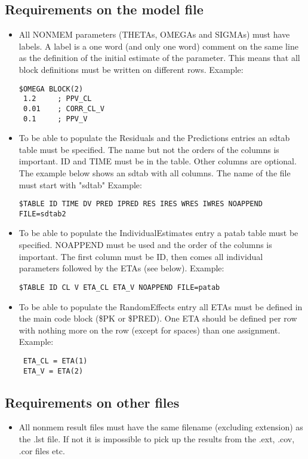 \subsection{Requirements on the model file}
\begin{itemize}
    \item All NONMEM parameters (THETAs, OMEGAs and SIGMAs) must have labels. A label is a one word (and only one word) comment on the same line as the definition of the initial estimate of the parameter. This means that all block definitions must be written on different rows. Example:
        \begin{verbatim}
$OMEGA BLOCK(2)
 1.2     ; PPV_CL
 0.01    ; CORR_CL_V
 0.1     ; PPV_V
        \end{verbatim}
    \item To be able to populate the Residuals and the Predictions entries an sdtab table must be specified. The name but not the orders of the columns is important. ID and TIME must be in the table. Other columns are optional. The example below shows an sdtab with all columns. The name of the file must start with "sdtab" Example:
        \begin{verbatim}
$TABLE ID TIME DV PRED IPRED RES IRES WRES IWRES NOAPPEND FILE=sdtab2
        \end{verbatim}
    \item To be able to populate the IndividualEstimates entry a patab table must be specified. NOAPPEND must be used and the order of the columns is important. The first column must be ID, then comes all individual parameters followed by the ETAs (see below). Example:
        \begin{verbatim}
$TABLE ID CL V ETA_CL ETA_V NOAPPEND FILE=patab
        \end{verbatim}
    \item To be able to populate the RandomEffects entry all ETAs must be defined in the main code block (\$PK or \$PRED). One ETA should be defined per row with nothing more on the row (except for spaces) than one assignment. Example:
        \begin{verbatim}
 ETA_CL = ETA(1)
 ETA_V = ETA(2)
        \end{verbatim}
\end{itemize}


\subsection{Requirements on other files}
\begin{itemize}
    \item All nonmem result files must have the same filename (excluding extension) as the .lst file. If not it is impossible to pick up the results from the .ext, .cov, .cor files etc.
\end{itemize}

